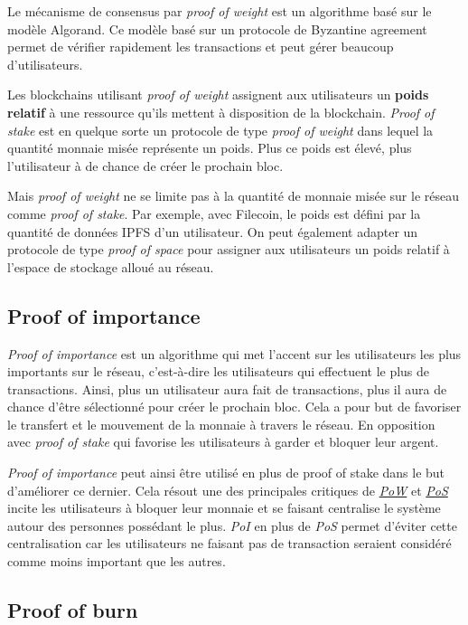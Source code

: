 \documentclass[../tb_report.tex]{subfiles}
\begin{document}
Le mécanisme de consensus par \textit{proof of weight} est un algorithme basé sur le modèle Algorand. Ce modèle basé sur un protocole de Byzantine agreement permet de vérifier rapidement les transactions et peut gérer beaucoup d'utilisateurs. 

Les blockchains utilisant \textit{proof of weight} assignent aux utilisateurs un \textbf{poids relatif} à une ressource qu'ils mettent à disposition de la blockchain. \textit{Proof of stake} est en quelque sorte un protocole de type \textit{proof of weight} dans lequel la quantité monnaie misée représente un poids. Plus ce poids est élevé, plus l'utilisateur à de chance de créer le prochain bloc.

Mais \textit{proof of weight} ne se limite pas à la quantité de monnaie misée sur le réseau comme \textit{proof of stake}. Par exemple, avec Filecoin, le poids est défini par la quantité de données IPFS d'un utilisateur. On peut également adapter un protocole de type \textit{proof of space} pour assigner aux utilisateurs un poids relatif à l'espace de stockage alloué au réseau.

\subsection{Proof of importance}

\textit{Proof of importance} est un algorithme qui met l'accent sur les utilisateurs les plus importants sur le réseau, c'est-à-dire les utilisateurs qui effectuent le plus de transactions. Ainsi, plus un utilisateur aura fait de transactions, plus il aura de chance d'être sélectionné pour créer le prochain bloc. Cela a pour but de favoriser le transfert et le mouvement de la monnaie à travers le réseau. En opposition avec \textit{proof of stake} qui favorise les utilisateurs à garder et bloquer leur argent.

\textit{Proof of importance} peut ainsi être utilisé en plus de proof of stake dans le but d'améliorer ce dernier. Cela résout une des principales critiques de \hyperref[consensus:pow]{\textit{PoW}} et \hyperref[consensus:pos]{\textit{PoS}} incite les utilisateurs à bloquer leur monnaie et se faisant centralise le système autour des personnes possédant le plus. \textit{PoI} en plus de \textit{PoS} permet d'éviter cette centralisation car les utilisateurs ne faisant pas de transaction seraient considéré comme moins important que les autres.

\subsection{Proof of burn}
\end{document}
